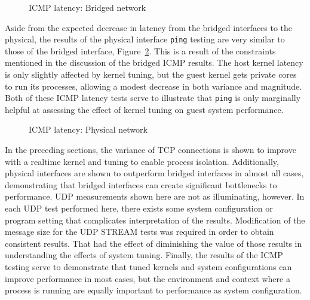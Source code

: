 \begin{figure}
    \centering
    \def\svgwidth{\columnwidth}
    
    \caption{ICMP latency: Bridged network}
    \label{fig:icmplatencybridge}
\end{figure}
Aside from the expected decrease in latency from the bridged interfaces to the physical, the results of the physical interface \texttt{ping} testing are very similar to those of the bridged interface, Figure~\ref{fig:icmplatencyphys}.  
This is a result of the constraints mentioned in the discussion of the bridged ICMP results.
The host kernel latency is only slightly affected by kernel tuning, but the guest kernel gets private cores to run its processes, allowing a modest decrease in both variance and magnitude.  
Both of these ICMP latency tests serve to illustrate that \texttt{ping} is only marginally helpful at assessing the effect of kernel tuning on guest system performance.  

\begin{figure}
    \centering
    \def\svgwidth{\columnwidth}
    
    \caption{ICMP latency: Physical network}
    \label{fig:icmplatencyphys}
\end{figure}


In the preceding sections, the variance of TCP connections is shown to improve with a realtime kernel and tuning to enable process isolation.
Additionally, physical interfaces are shown to outperform bridged interfaces in almost all cases, demonstrating that bridged interfaces can create significant bottlenecks to performance.
UDP measurements shown here are not as illuminating, however.  
In each UDP test performed here, there exists some system configuration or program setting that complicates interpretation of the results.
Modification of the message size for the UDP STREAM tests was required in order to obtain consistent results.  
That had the effect of diminishing the value of those results in understanding the effects of system tuning.
Finally, the results of the ICMP testing serve to demonstrate that tuned kernels and system configurations can improve performance in most cases, but the environment and context where a process is running are equally important to performance as system configuration.

